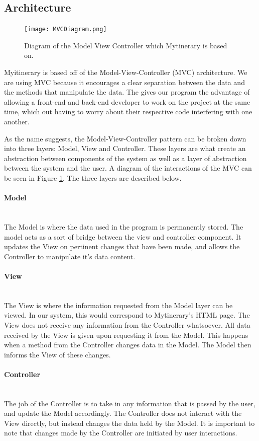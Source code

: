 \documentclass[12pt]{article}
\begin{document}
\subsection{Architecture}
%
\begin{figure}[ht!]
\centering
\texttt{[image: MVCDiagram.png]}
\caption{Diagram of the Model View Controller which Mytinerary is based on. \label{MVC}}
\end{figure}
%
Myitinerary is based off of the Model-View-Controller (MVC) architecture. We are using MVC because it encourages a clear separation between the data and the methods that manipulate the data. The gives our program the advantage of allowing a front-end and back-end developer to work on the project at the same time, which out having to worry about their respective code interfering with one another.

As the name suggests, the Model-View-Controller pattern can be broken down into three layers: Model, View and Controller. These layers are what create an abstraction between components of the system as well as a layer of abstraction between the system and the user. A diagram of the interactions of the MVC can be seen in Figure \ref{MVC}. The three layers are described below.
%
\paragraph*{Model}~\\
The Model is where the data used in the program is permanently stored. The model acts as a sort of bridge between the view and controller component. It updates the View on pertinent changes that have been made, and allows the Controller to manipulate it's data content. 
\paragraph*{View}~\\
The View is where the information requested from the Model layer can be viewed. In our system, this would correspond to Mytinerary's HTML page. The View does not receive any information from the Controller whatsoever. All data received by the View is given upon requesting it from the Model. This happens when a method from the Controller changes data in the Model. The Model then informs the View of these changes.
%
\paragraph*{Controller}~\\
The job of the Controller is to take in any information that is passed by the user, and update the Model accordingly. The Controller does not interact with the View directly, but instead changes the data held by the Model. It is important to note that changes made by the Controller are initiated by user interactions.
%
\end{document}
